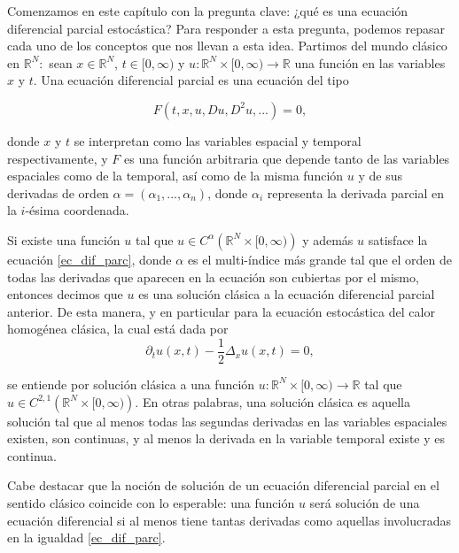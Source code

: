 \documentclass[letterpaper,twoside,12pt]{book}
\newcommand{\R}{\mathbb{R}}
\newcommand{\1}{\mathds{1}}
\renewcommand{\to}{\rightarrow}
\theoremstyle{definition}
\theoremstyle{definition}
\theoremstyle{remark}
\theoremstyle{definition}
\theoremstyle{definition}
\theoremstyle{definition}
\theoremstyle{definition}
\theoremstyle{definition}
\begin{document}
Comenzamos en este capítulo con la pregunta clave: ¿qué es una ecuación diferencial parcial estocástica? Para responder a esta pregunta, podemos repasar cada uno de los conceptos que nos llevan a esta idea. Partimos del mundo clásico en $\R^{N}:$ sean $x\in \R^{N}$, $t\in [0,\infty)$ y $u:\R^{N}\times[0,\infty)\to \R$ una función en las variables $x$ y $t$. Una ecuación diferencial parcial es una ecuación del tipo 

\begin{equation}\label{ec_dif_parc}
    F(t,x,u,Du,D^2u,...)=0,    
\end{equation}

donde $x$ y $t$ se interpretan como las variables espacial y temporal respectivamente, y $F$ es una función arbitraria que depende tanto de las variables espaciales como de la temporal, así como de la misma función $u$ y de sus derivadas de orden $\alpha=(\alpha_1,...,\alpha_n)$, donde $\alpha_i$ representa la derivada parcial en la $i$-ésima coordenada.

Si existe una función $u$ tal que $u\in C^{\alpha}\left(\R^{N}\times [0,\infty)\right)$ y además $u$ satisface la ecuación \eqref{ec_dif_parc}, donde $\alpha$ es el multi-índice más grande tal que el orden de todas las derivadas que aparecen en la ecuación son cubiertas por el mismo, entonces decimos que $u$ es una solución clásica a la ecuación diferencial parcial anterior. De esta manera, y en particular para la ecuación estocástica del calor homogénea clásica, la cual está dada por 
   \begin{equation*}
      \partial_tu(x,t)-\frac{1}{2}\Delta_x u(x,t)=0,
   \end{equation*}

se entiende por solución clásica a una función $u:\R^{N}\times[0,\infty)\to \R$ tal que $u\in C^{2,1}\left(\R^{N}\times [0,\infty)\right)$. En otras palabras, una solución clásica es aquella solución tal que al menos todas las segundas derivadas en las variables espaciales existen, son continuas, y al menos la derivada en la variable temporal existe y es continua. 

Cabe destacar que la noción de solución de un ecuación diferencial parcial en el sentido clásico coincide con lo esperable: una función $u$ será solución de una ecuación diferencial si al menos tiene tantas derivadas como aquellas involucradas en la igualdad \eqref{ec_dif_parc}.
\end{document}
